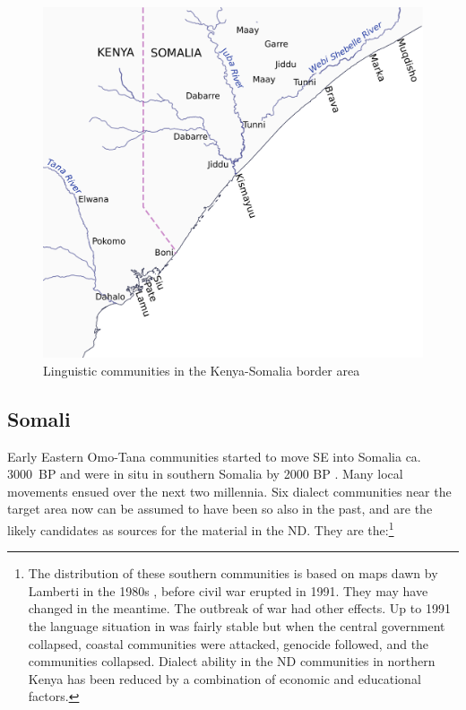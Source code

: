 \documentclass[output=paper
,newtxmath
,modfonts
,nonflat]{langsci/langscibook}
\begin{document}
\begin{figure}
\includegraphics[width=\textwidth]{figures/nurse.pdf}
\caption{Linguistic communities in the Kenya-Somalia border area}
\label{fig:nurse:1}
\end{figure}

\subsection{Somali}\label{sec:nurse:2.2} 

Early Eastern Omo-Tana communities started to move SE into Somalia ca. 3000~BP and were in situ in southern Somalia by 2000 BP \citep{ehret1995}. Many local movements ensued over the next two millennia. Six  dialect communities near the target area now can be assumed to have been so also in the past, and are the likely candidates as sources for the material in the ND. They are the:\footnote{The distribution of these southern  communities is based on maps dawn by Lamberti in the 1980s \citep{Lamberti1983}, before civil war erupted in 1991. They may have changed in the meantime. The outbreak of war had other effects. Up to 1991 the language situation in  was fairly stable but when the central government collapsed, coastal  communities were attacked, genocide followed, and the communities collapsed. Dialect ability in the ND communities in northern Kenya has been reduced by a combination of economic and educational factors.}
\end{document}
